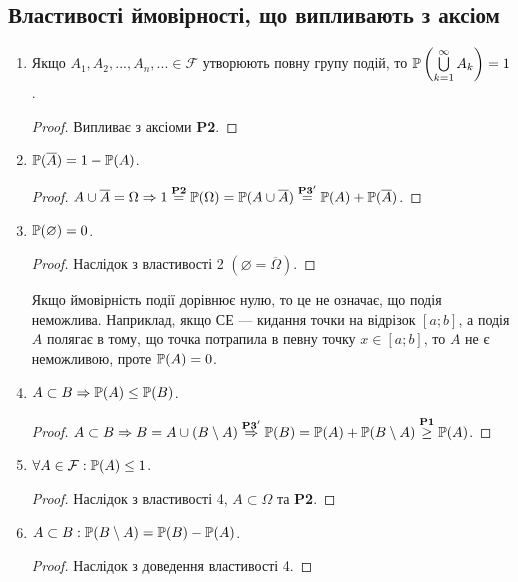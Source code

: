 \subsection{Властивості ймовірності, що випливають з аксіом}
\begin{enumerate}
    \item Якщо $A_1, A_2, ..., A_n, ... \in \mathcal{F}$ утворюють повну групу 
    подій, то $\P\left(\bigcup\limits_{k=1}^\infty A_k\right) = 1$.
    \begin{proof}
        Випливає з аксіоми \textbf{P2}.
    \end{proof}
    \item $\P(\overline{A}) = 1 - \P(A)$.
    \begin{proof}
        $A \cup \overline{A} = \Omega \Rightarrow 1 \overset{\text{\textbf{P2}}}{=} \P(\Omega) 
        = \P(A \cup \overline{A}) \overset{\text{\textbf{P3}}'}{=} \P(A) + \P(\overline{A})$.
    \end{proof}
    \item $\P(\varnothing) = 0$.
    \begin{proof}
        Наслідок з властивості 2 $(\varnothing = \overline{\Omega})$.
    \end{proof}
    \begin{remark}
        Якщо ймовірність події дорівнює нулю, то це не означає, що подія неможлива. Наприклад,
        якщо СЕ --- кидання точки на відрізок $[a; b]$, а подія $A$ полягає в тому, що точка потрапила в 
        певну точку $x \in [a; b]$, то $A$ не є неможливою, проте $\P(A) = 0$.
    \end{remark}
    \item $A \subset B \Rightarrow \P(A) \leq \P(B)$.
    \begin{proof}
        $A \subset B \Rightarrow B = A \cup (B \setminus A) 
        \overset{\text{\textbf{P3}}'}{\Rightarrow} \P(B) = \P(A) + \P(B \setminus A) 
        \overset{\text{\textbf{P1}}}{\geq} \P(A)$.
    \end{proof}
    \item $\forall A \in \mathcal{F}: \P(A) \leq 1$.
    \begin{proof}
        Наслідок з властивості 4, $A \subset \Omega$ та \textbf{P2}.
    \end{proof}
    \item $A \subset B: \P(B \setminus A) = \P(B) - \P(A)$.
    \begin{proof}
        Наслідок з доведення властивості 4.
    \end{proof}

\end{enumerate}
